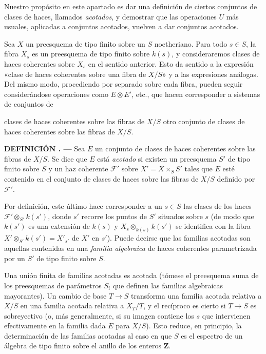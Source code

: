 \documentclass[11pt,twoside,openany]{book}
\numberwithin{equation}{section}
\newcommand{\src}[1]{%
  \phantomsection\hypertarget{src:#1}{}%
  \marginpar{\raggedleft\footnotesize\sffamily #1}%
}
\theoremstyle{plain}
\theoremstyle{definition}
\theoremstyle{remark}
\newcommand{\result}[2]{%
  \par\medskip\noindent\textbf{#1%
  \if\relax\detokenize{#2}\relax\else\space#2\fi. ---}\enspace
}
\newcommand{\FgaUnitKey}{frontmatter}
\renewcommand{\src}[1]{%
  \phantomsection\hypertarget{src:\FgaUnitKey:#1}{}%
  \marginpar{\raggedleft\footnotesize\sffamily #1}%
}
\theoremstyle{plain}
\theoremstyle{definition}
\theoremstyle{remark}
\begin{document}
Nuestro propósito en este apartado es dar una definición de ciertos conjuntos
de clases de haces, llamados \emph{acotados}, y demostrar que las operaciones
$U$ más usuales, aplicadas a conjuntos acotados, vuelven a dar conjuntos
acotados.

Sea $X$ un preesquema de tipo finito sobre un $S$ noetheriano. Para todo
$s\in S$, la fibra $X_s$ es un preesquema de tipo finito sobre $k(s)$, y
consideraremos clases de haces coherentes sobre $X_s$ en el sentido anterior.
Esto da sentido a la expresión «clase de haces coherentes sobre una fibra de
$X/S$» y a las expresiones análogas. Del mismo modo, procediendo por separado
sobre cada fibra, pueden seguir considerándose operaciones como
$E\otimes E'$, etc., que hacen corresponder a sistemas de conjuntos de
\src{251}
clases de haces coherentes sobre las fibras de $X/S$ otro conjunto de clases
de haces coherentes sobre las fibras de $X/S$.

\result{DEFINICIÓN}{1.1} Sea $E$ un conjunto de clases de haces coherentes
sobre las fibras de $X/S$. Se dice que $E$ está \emph{acotado} si existen un
preesquema $S'$ de tipo finito sobre $S$ y un haz coherente $\mathcal F'$ sobre
$X'=X\times_S S'$ tales que $E$ esté contenido en el conjunto de clases de
haces sobre las fibras de $X/S$ definido por $\mathcal F'$.

Por definición, este último hace corresponder a un $s\in S$ las clases de los
haces $\mathcal F'\otimes_{S'}k(s')$, donde $s'$ recorre los puntos de $S'$
situados sobre $s$ (de modo que $k(s')$ es una extensión de $k(s)$ y
$X_s\otimes_{k(s)}k(s')$ se identifica con la fibra
$X'\otimes_{S'}k(s')=X'_{s'}$ de $X'$ en $s'$). Puede decirse que las familias
acotadas son aquellas contenidas en una \emph{familia algebraica} de haces
coherentes parametrizada por un $S'$ de tipo finito sobre $S$.

Una unión finita de familias acotadas es acotada (tómese el preesquema suma de
los preesquemas de parámetros $S_i$ que definen las familias algebraicas
mayorantes). Un cambio de base $T\longrightarrow S$ transforma una familia
acotada relativa a $X/S$ en una familia acotada relativa a $X_T/T$, y el
recíproco es cierto si $T\longrightarrow S$ es sobreyectivo (o, más
generalmente, si su imagen contiene los $s$ que intervienen efectivamente en la
familia dada $E$ para $X/S$). Esto reduce, en principio, la determinación de
las familias acotadas al caso en que $S$ es el espectro de un álgebra de tipo
finito sobre el anillo de los enteros $\mathbf Z$.
\end{document}
